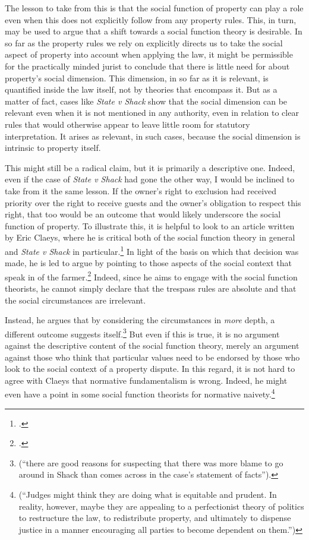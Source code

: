 The lesson to take from this is that the social function of property can play a role even when this does not explicitly follow from any property rules. This, in turn, may be used to argue that a shift towards a social function theory is desirable. In so far as the property rules we rely on explicitly directs us to take the social aspect of property into account when applying the law, it might be permissible for the practically minded jurist to conclude that there is little need for  about property's social dimension. This dimension, in so far as it is relevant, is quantified inside the law itself, not by theories that encompass it. But as a matter of fact, cases like {\it State v Shack} show that the social dimension can be relevant even when it is not mentioned in any authority, even in relation to clear rules that would otherwise appear to leave little room for statutory interpretation. It arises as relevant, in such cases, because the social dimension is intrinsic to property itself. 

This might still be a radical claim, but it is primarily a descriptive one. Indeed, even if the case of {\it State v Shack} had gone the other way, I would be inclined to take from it the same lesson. If the owner's right to exclusion had received priority over the  right to receive guests and the owner's obligation to respect this right, that too would be an outcome that would likely underscore the social function of property. To illustrate this, it is helpful to look to an article written by Eric Claeys, where he is critical both of the social function theory in general and {\it State v Shack} in particular.\footcite{claeys09} In light of the basis on which that decision was made, he is led to argue by pointing to those aspects of the social context that speak in  of the farmer.\footnote{\cite[941-942]{claeys09}.} Indeed, since he aims to engage with the social function theorists, he cannot simply declare that the trespass rules are absolute and that the social circumstances are irrelevant. 

Instead, he argues that by considering the circumstances in {\it more} depth, a different outcome suggests itself.\footnote{\cite[941]{claeys09} (``there are good reasons for suspecting that there was more blame to go around in Shack than comes across in the case's statement of facts'').} But even if this is true, it is no argument against the descriptive content of the social function theory, merely an argument against those who think that particular values need to be endorsed by those who look to the social context of a property dispute. In this regard, it is not hard to agree with Claeys that normative fundamentalism is wrong. Indeed, he might even have a point in  some social function theorists for normative naivety.\footnote{\cite[945]{claeys09} (``Judges might think they are doing what is equitable and prudent. In reality, however, maybe
they are appealing to a perfectionist theory of politics to restructure the law, to redistribute property, and ultimately to dispense justice in a manner encouraging all parties to become dependent on them.'')} 

